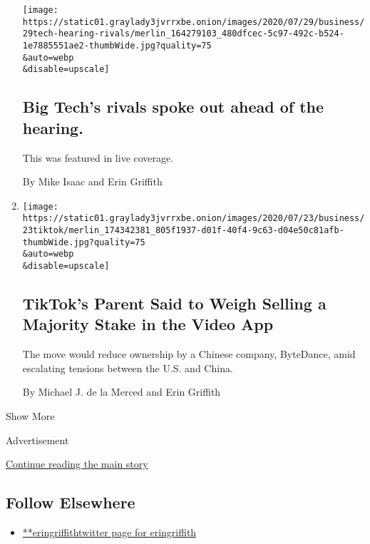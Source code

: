 \begin{enumerate}
  \texttt{[image: https://static01.graylady3jvrrxbe.onion/images/2020/07/29/business/29tech-hearing-rivals/merlin\_164279103\_480dfcec-5c97-492c-b524-1e7885551ae2-thumbWide.jpg?quality=75\\\&auto=webp\\\&disable=upscale]}

  \hypertarget{big-techs-rivals-spoke-out-ahead-of-the-hearing}{%
  \subsection{Big Tech's rivals spoke out ahead of the
  hearing.}\label{big-techs-rivals-spoke-out-ahead-of-the-hearing}}

  This was featured in live coverage.

  By Mike Isaac and Erin Griffith
\item
  \href{/2020/07/23/business/dealbook/tiktok-bytedance-investors-trump.html}{}

  \texttt{[image: https://static01.graylady3jvrrxbe.onion/images/2020/07/23/business/23tiktok/merlin\_174342381\_805f1937-d01f-40f4-9c63-d04e50c81afb-thumbWide.jpg?quality=75\\\&auto=webp\\\&disable=upscale]}

  \hypertarget{tiktoks-parent-said-to-weigh-selling-a-majority-stake-in-the-video-app}{%
  \subsection{TikTok's Parent Said to Weigh Selling a Majority Stake in
  the Video
  App}\label{tiktoks-parent-said-to-weigh-selling-a-majority-stake-in-the-video-app}}

  The move would reduce ownership by a Chinese company, ByteDance, amid
  escalating tensions between the U.S. and China.

  By Michael J. de la Merced and Erin Griffith
\end{enumerate}

Show More

Advertisement

\protect\hyperlink{after-mid2}{Continue reading the main story}

\hypertarget{follow-elsewhere}{%
\subsection{Follow Elsewhere}\label{follow-elsewhere}}

\begin{itemize}
\tightlist
\item
  \href{https://twitter.com/eringriffith}{**eringriffithtwitter page for
  eringriffith}
\end{itemize}

